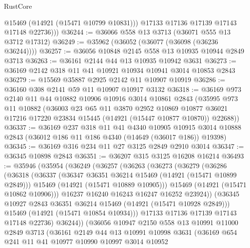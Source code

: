 \begin{lexlean}{RustCore}
\begin{coremodule}
            @15469
            (@14921 (@15471 @10799 @10831)))
          @17133
          @17136
          @17139
          @17143
          @17148
          @22736)))
@36244 := @36066 @558 @13 @3713 (@36071 @555 @13 @3712 @17312)
@36249 := @35962 (@36052 (@36077 (@36098 (@36236 @36244))))
@36257 := @36056 @10848 @2145 @558 @13 @10935 @10944 @2849 @3713
@36263 := @36161 @2144 @44 @13 @10935 @10942 @3631
@36273 := @36169 @2142 @318 @11 @41 @10921 @10934 @10941 @3014 @10853 @2843
@36279 := @15569 @35887 @2925 @2142 @11 @10907 @10919
@36286 := @36160 @308 @2141 @59 @11 @10907 @10917 @3132
@36318 := @36169
    @973
    @2140
    @11
    @44
    @10882
    @10906
    @10916
    @3014
    @10861
    @2843
    (@35995
      @973
      @11
      @10882
      (@36003
        @23
        @65
        @11
        @3870
        @2952
        @10869
        @10877
        @36021
        @17216
        @17220
        @23834
        @15445
        (@14921 (@15447 @10877 @10870))
        @22688))
@36337 := @36169
    @237
    @318
    @11
    @41
    @4340
    @10905
    @10915
    @3014
    @10888
    @2843
    (@36012 @186 @11 @186 @4340 (@14649 (@36017 @186)) @19398)
@36345 := @36169 @316 @234 @11 @27 @3125 @2849 @2910 @3014
@36347 := @36345 @10898 @2843
@36351 := @36207 @315 @3125 @16208 @16214
@36493 := @35946
    (@35954
      (@36249
        (@36257
          (@36263
            (@36273
              (@36279
                (@36286
                  (@36318
                    (@36337
                      (@36347 @36351 @36214 @15469 (@14921 (@15471 @10899 @2849)))
                      @15469
                      (@14921 (@15471 @10889 @10905)))
                    @15469
                    (@14921 (@15471 @10862 @10906)))
                  @16237
                  @16240
                  @16243
                  @16247
                  @16252
                  @23924))
              (@36345 @10927 @2843 @36351 @36214 @15469 (@14921 (@15471 @10928 @2849)))
              @15469
              (@14921 (@15471 @10854 @10934)))
            @17133
            @17136
            @17139
            @17143
            @17148
            @22736)
          @36244))
      (@36056
        @10947
        @2150
        @558
        @13
        @10991
        @11000
        @2849
        @3713
        (@36161
          @2149
          @44
          @13
          @10991
          @10998
          @3631
          (@36169
            @654
            @241
            @11
            @41
            @10977
            @10990
            @10997
            @3014
            @10952

\end{coremodule}
\end{lexlean}
